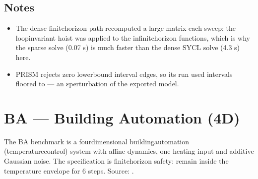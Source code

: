 \documentclass[a4paper,10pt,english]{sphinxmanual}
\begin{document}
\subsection{Notes}
\label{\detokenize{benchmarks/AS:notes}}\begin{itemize}
\item {} 
\sphinxAtStartPar
The dense finite\sphinxhyphen{}horizon path recomputed a large  matrix each sweep; the
loop\sphinxhyphen{}invariant hoist was applied to the infinite\sphinxhyphen{}horizon functions, which is why
the sparse solve (0.07 s) is much faster than the dense SYCL solve (4.3 s) here.

\item {} 
\sphinxAtStartPar
PRISM rejects zero lower\sphinxhyphen{}bound interval edges, so its run used intervals floored to
\sphinxcode{\sphinxupquote{{[}1e\sphinxhyphen{}9, hi{]}}} — an ε\sphinxhyphen{}perturbation of the exported model.

\end{itemize}

\sphinxstepscope


\section{BA — Building Automation (4D)}
\label{\detokenize{benchmarks/BA:ba-building-automation-4d}}\label{\detokenize{benchmarks/BA::doc}}
\sphinxAtStartPar
The BA benchmark is a four\sphinxhyphen{}dimensional building\sphinxhyphen{}automation (temperature\sphinxhyphen{}control)
system with affine dynamics, one heating input and additive Gaussian noise. The
specification is finite\sphinxhyphen{}horizon safety: remain inside the temperature envelope for 6
steps. Source: .
\end{document}
